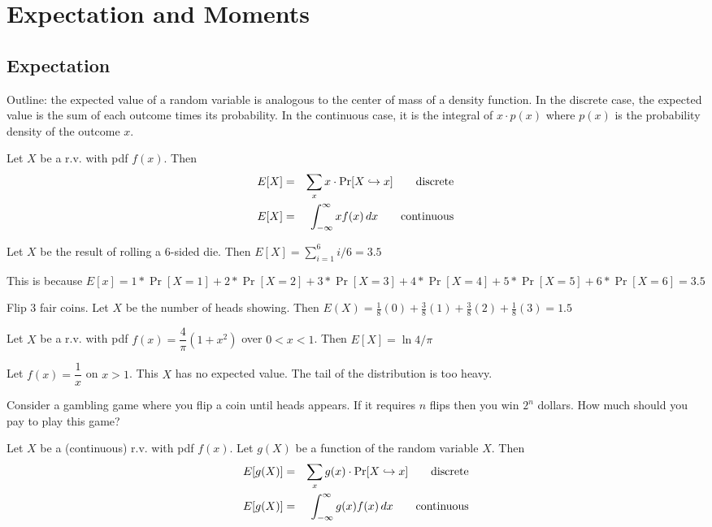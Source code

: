 \documentclass[../main.tex]{subfiles}
\begin{document}
\chapter{Expectation and Moments}
\section{Expectation}
Outline: the expected value of a random variable is analogous to the center of mass of a density function. In the discrete case, the expected value is the sum of each outcome times its probability. In the continuous case, it is the integral of $x \cdot p(x)$
where $p(x)$ is the probability density of the outcome $x$.

\begin{definition}
Let $X$ be a r.v. with pdf $f(x)$. Then 
\begin{eqnarray*}
    E[X] &=& \sum_x x\cdot\mathrm{Pr}[X\hookrightarrow x] \qquad \mbox{discrete} \\
    E[X] &=& \int_{-\infty}^{\infty} x f(x) \,dx \qquad \mbox{continuous}
\end{eqnarray*}
\end{definition}
\begin{example}
Let $X$ be the result of rolling a 6-sided die. Then $E[X] = \sum_{i=1}^6 i/6 = 3.5$
\end{example}
\begin{solution}
This is because $E[x]=1*\Pr[X=1] + 2*\Pr[X=2] + 3*\Pr[X=3] + 4*\Pr[X=4] + 5*\Pr[X=5] + 6*\Pr[X=6] = 3.5$

\end{solution}
\begin{example}
Flip 3 fair coins. Let $X$ be the number of heads showing. Then $E(X) = \frac18(0)+
\frac38(1) + \frac38(2) + \frac18(3) = 1.5$
\end{example}
\begin{example}
Let $X$ be a r.v. with pdf $f(x) = \dfrac{4}{\pi}(1+x^2)$ over $0<x<1$. Then $E[X] = \ln 4/\pi$
\end{example}
\begin{example}
Let $f(x) = \dfrac{1}{x}$ on $x>1$. This $X$ has no expected value. The tail of the distribution is too heavy.
\end{example}
\begin{remark}
Consider a gambling game where you flip a coin until heads appears. If it requires $n$ flips then you win $2^n$ dollars. How much should you pay to play this game?
\end{remark}
\begin{definition}
Let $X$ be a (continuous) r.v. with pdf $f(x)$. Let $g(X)$ be a function of the random variable $X$. Then
\begin{eqnarray*}
    E[g(X)] &=& \sum_x g(x)\cdot\mathrm{Pr}[X\hookrightarrow x] \qquad \mbox{discrete} \\
    E[g(X)] &=& \int_{-\infty}^{\infty} g(x) f(x) \,dx \qquad \mbox{continuous}
\end{eqnarray*}
\end{definition}
\end{document}
